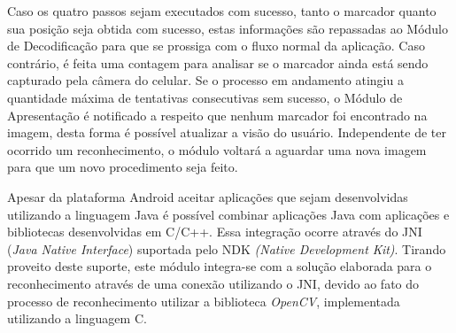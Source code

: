 	Caso os quatro passos sejam executados com sucesso, tanto o marcador quanto sua posição seja obtida 
	com sucesso, estas informações são repassadas ao Módulo de Decodificação para que se prossiga com o fluxo 
	normal da aplicação. Caso contrário, é feita uma contagem para analisar se o marcador ainda está sendo 
	capturado pela câmera do celular. Se o processo em andamento atingiu a quantidade máxima de tentativas 
	consecutivas sem sucesso, o Módulo de Apresentação é notificado a respeito que nenhum marcador foi encontrado na 
	imagem, desta forma é possível atualizar a visão do usuário. Independente de ter ocorrido um reconhecimento, 
	o módulo voltará a aguardar	uma nova imagem para que um novo procedimento seja feito.
	
	Apesar da plataforma Android aceitar aplicações que sejam desenvolvidas utilizando a linguagem Java é
	possível combinar aplicações Java com aplicações e bibliotecas desenvolvidas em C/C++. Essa
	integração ocorre através do JNI (\textit{Java Native Interface}) suportada pelo 
	NDK \textit{(Native Development Kit)}. Tirando proveito deste suporte, este módulo integra-se com
	a solução elaborada para o reconhecimento através de uma conexão utilizando o JNI, devido ao fato
	do processo de reconhecimento utilizar a biblioteca \textit{OpenCV}, implementada utilizando a
	linguagem C.
